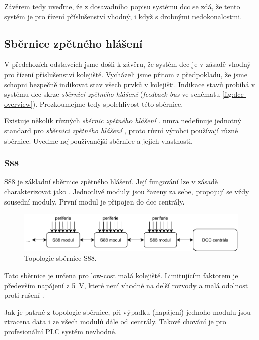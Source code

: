 Závěrem tedy uveďme, že z dosavadního popisu systému \gls{dcc} se zdá, že tento
systém je pro řízení příslušenství vhodný, i když s drobnými nedokonalostmi.

\subsection{Sběrnice zpětného hlášení}

V předchozích odstavcích jsme došli k závěru, že systém \gls{dcc} je v zásadě
vhodný pro řízení příslušenství kolejiště. Vycházeli jsme přitom z předpokladu,
že jsme schopni bezpečně indikovat stav všech prvků v kolejišti. Indikace stavů
probíhá v systému \gls{dcc} skrze \textit{sběrnici zpětného hlášení}
(\textit{feedback bus} ve schématu \ref{fig:dcc-overview}). Prozkoumejme tedy
spolehlivost této sběrnice.

Existuje několik různých \textit{sběrnic zpětného hlášení}
\cite{dcc_feedbacks:web}. \gls{nmra} nedefinuje jednotný standard pro
\textit{sběrnici zpětného hlášení} \cite{dcc_specs:web}, proto různí výrobci
používají různé sběrnice. Uveďme nejpoužívanější sběrnice a jejich vlastnosti.

\subsubsection{S88}

S88 je základní sběrnice zpětného hlášení. Její fungování lze v zásadě
charakterizovat jako  \cite{s88:web}. Jednotlivé
moduly jsou řazeny za sebe, propojují se vždy sousední moduly. První modul
je připojen do \gls{dcc} centrály.

\begin{figure}[ht!]
\includegraphics[width=\textwidth]{data/s88.pdf}
\caption{Topologic sběrnice S88.}
\label{fig:s88-topology}
\end{figure}

Tato sběrnice je určena pro low-cost malá kolejiště. Limitujícím faktorem
je především napájení z 5~V, které není vhodné na delší rozvody a malá odolnost
proti rušení \cite{s88:web}.

Jak je patrné z topologie sběrnice, při výpadku (napájení) jednoho modulu
jsou ztracena data i ze všech modulů dále od centrály. Takové chování je pro
profesionální PLC systém nevhodné.

